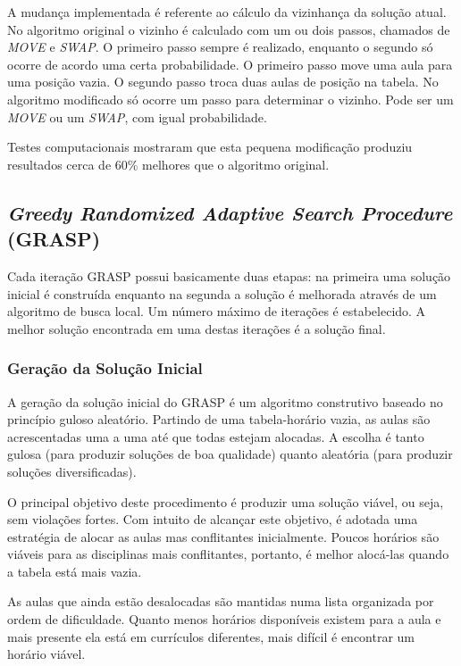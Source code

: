 \documentclass[11pt]{article}
\begin{document}
A mudança implementada é referente ao cálculo da vizinhança da solução atual. No algoritmo original o vizinho é calculado com um ou dois passos, chamados de \textit{MOVE} e \textit{SWAP}. O primeiro passo sempre é realizado, enquanto o segundo só ocorre de acordo uma certa probabilidade. O primeiro passo move uma aula para uma posição vazia. O segundo passo troca duas aulas de posição na tabela. No algoritmo modificado só ocorre um passo para determinar o vizinho. Pode ser um \textit{MOVE} ou um \textit{SWAP}, com igual probabilidade.

Testes computacionais mostraram que esta pequena modificação produziu resultados cerca de $60\%$ melhores que o algoritmo original.

\subsection{\textit{Greedy Randomized Adaptive Search Procedure} (GRASP)}

Cada iteração GRASP \cite{grasp_resende_ribeiro} possui basicamente duas etapas: na primeira uma solução inicial é construída enquanto na segunda a solução é melhorada através de um algoritmo de busca local. Um número máximo de iterações é estabelecido. A melhor solução encontrada em uma destas iterações é a solução final.

\subsubsection{Geração da Solução Inicial}

A geração da solução inicial do GRASP é um algoritmo construtivo baseado no princípio guloso aleatório. Partindo de uma tabela-horário vazia, as aulas são acrescentadas uma a uma até que todas estejam alocadas. A escolha é tanto gulosa (para produzir soluções de boa qualidade) quanto aleatória (para produzir soluções diversificadas).

O principal objetivo deste procedimento é produzir uma solução viável, ou seja, sem violações fortes. Com intuito de alcançar este objetivo, é adotada uma estratégia de alocar as aulas mas conflitantes inicialmente. Poucos horários são viáveis para as disciplinas mais conflitantes, portanto, é melhor alocá-las quando a tabela está mais vazia.

As aulas que ainda estão desalocadas são mantidas numa lista organizada por ordem de dificuldade. Quanto menos horários disponíveis existem para a aula e mais presente ela está em currículos diferentes, mais difícil é encontrar um horário viável.
\end{document}
